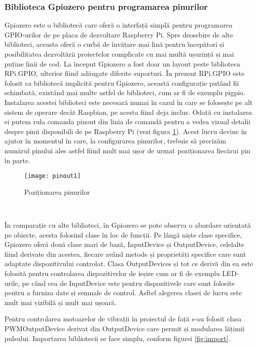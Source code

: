 \documentclass[../IoMusT.tex]{subfiles}
\begin{document}
\subsubsection{Biblioteca Gpiozero pentru programarea pinurilor}
Gpiozero este o bibliotecă care oferă o interfață simplă pentru programarea GPIO-urilor de pe placa de dezvoltare Raspberry Pi. Spre deosebire de alte biblioteci, aceasta oferă o curbă de învățare mai lină pentru începători și posibilitatea dezvoltării proiectelor complicate cu mai multă ușurință și mai puține linii de cod. La început Gpiozero a fost doar un layout peste biblioteca RPi.GPIO, ulterior fiind adăugate diferite suporturi. În prezent RPi.GPIO este folosit ca bibliotecă implicită pentru Gpiozero, această configurație putând fii schimbată, existând mai multe astfel de biblioteci, cum ar fi de exemplu pigpio. Instalarea acestei biblioteci este necesară numai în cazul în care se folosește pe alt sistem de operare decât Raspbian, pe acesta fiind deja inclus. Odată cu instalarea ei putem rula comanda pinout din linia de comandă pentru a vedea vizual detalii despre pinii disponibili de pe Raspberry Pi (vezi figura \ref{fig:pinout}). Acest lucru devine în ajutor în momentul în care, la configurarea pinurilor, trebuie să precizăm numărul pinului ales astfel fiind mult mai ușor de urmat poziționarea fiecărui pin în parte.
\begin{figure}[h]
\centering
\texttt{[image: pinout1]}
\caption{Poziționarea pinurilor}
\label{fig:pinout}
\end{figure}
\\
\par În comparație cu alte biblioteci, în Gpiozero se pote observa o abordare orientată pe obiecte, acesta folosind clase în loc de funcții. Pe lângă niște clase specifice, Gpiozero oferă două clase mari de bază, InputDevice și OutputDevice, celelalte fiind derivate din acestea, fiecare având metode și proprietăți specifice care sunt adaptate dispozitivului controlat. Clasa OutputDevices și tot ce derivă din ea este folosită pentru controlarea dispozitivelor de ieșire cum ar fi de exemplu LED-urile, pe când cea de InputDevice este pentru dispozitivele care sunt folosite pentru a furniza date și semnale de control. Asftel alegerea clasei de lucru este mult mai vizibilă și mult mai ușoară.
\\
\par Pentru controlarea motoarelor de vibrații în proiectul de față s-au folosit clasa PWMOutputDevice derivat din OutputDevice care permit și modularea lățimii pulsului. Importarea bibliotecii se face simplu, conform figurei \ref{fig:import}.
\end{document}
